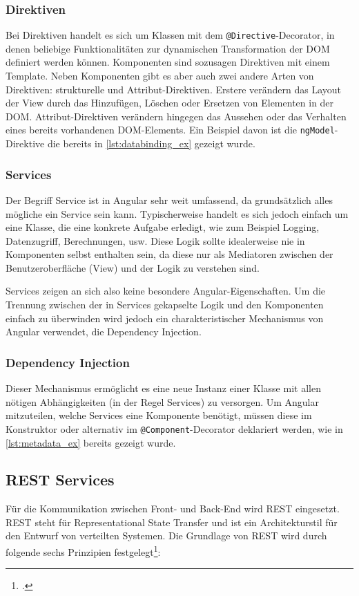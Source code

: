\subsubsection{Direktiven}
Bei Direktiven handelt es sich um Klassen mit dem \texttt{@Directive}-Decorator, in denen beliebige Funktionalitäten zur dynamischen Transformation der DOM definiert werden können. Komponenten sind sozusagen Direktiven mit einem Template. Neben Komponenten gibt es aber auch zwei andere Arten von Direktiven: strukturelle und Attribut-Direktiven. Erstere verändern das Layout der View durch das Hinzufügen, Löschen oder Ersetzen von Elementen in der \acs{DOM}. Attribut-Direktiven verändern hingegen das Aussehen oder das Verhalten eines bereits vorhandenen DOM-Elements. Ein Beispiel davon ist die \texttt{ngModel}-Direktive die bereits in \cref{lst:databinding_ex} gezeigt wurde.

\subsubsection{Services}
Der Begriff Service ist in Angular sehr weit umfassend, da grundsätzlich alles mögliche ein Service sein kann. Typischerweise handelt es sich jedoch einfach um eine Klasse, die eine konkrete Aufgabe erledigt, wie zum Beispiel Logging, Datenzugriff, Berechnungen, usw. Diese Logik sollte idealerweise nie in Komponenten selbst enthalten sein, da diese nur als Mediatoren zwischen der Benutzeroberfläche (View) und der Logik zu verstehen sind.

Services zeigen an sich also keine besondere Angular-Eigenschaften. Um die Trennung zwischen der in Services gekapselte Logik und den Komponenten einfach zu überwinden wird jedoch ein charakteristischer Mechanismus von Angular verwendet, die Dependency Injection. 

\subsubsection{Dependency Injection}
Dieser Mechanismus ermöglicht es eine neue Instanz einer Klasse mit allen nötigen Abhängigkeiten (in der Regel Services) zu versorgen. Um Angular mitzuteilen, welche Services eine Komponente benötigt, müssen diese im Konstruktor oder alternativ im \texttt{@Component}-Decorator deklariert werden, wie in \cref{lst:metadata_ex} bereits gezeigt wurde.

\subsection{REST Services}
Für die Kommunikation zwischen Front- und Back-End wird REST eingesetzt. REST steht für Representational State Transfer und ist ein Architekturstil für den Entwurf von verteilten Systemen. Die Grundlage von REST wird durch folgende sechs Prinzipien festgelegt\footcite[Vgl.][S. 1-3]{Varanasi2015}:

